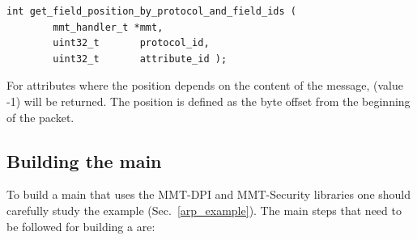 \begin{lstlisting}[style=Cpp]
int get_field_position_by_protocol_and_field_ids (
        mmt_handler_t *mmt,
        uint32_t       protocol_id,
        uint32_t       attribute_id );
\end{lstlisting}

For attributes where the position depends on the content of the message,  (value -1) will be returned. The position is defined as the byte offset from the beginning of the packet.



\subsection{Building the main}

To build a main that uses the MMT-DPI and MMT-Security libraries one should carefully study the  example (Sec.~\ref{arp_example}). The main steps that need to be followed for building a  are:

